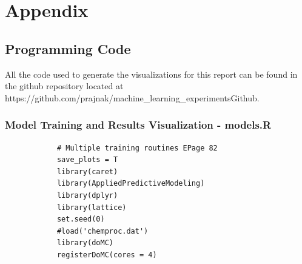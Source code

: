 \documentclass[letterpaper,12pt,titlepage,oneside,final]{report}
\newcommand{\href}[1]{#1} %
\begin{document}
\appendix
\chapter{Appendix}
    \section{Programming Code}
        \label{rcode}
        All the code used to generate the visualizations for this report can be found in the github repository located at \href{https://github.com/prajnak/machine_learning_experiments}{Github}.
        \subsection {Model Training and Results Visualization - models.R}
        \begin{multicols}{2}
        \begin{verbatim}
            # Multiple training routines EPage 82
            save_plots = T
            library(caret)
            library(AppliedPredictiveModeling)
            library(dplyr)
            library(lattice)
            set.seed(0)
            #load('chemproc.dat')
            library(doMC)
            registerDoMC(cores = 4)


\end{verbatim}
\end{multicols}
\end{document}

